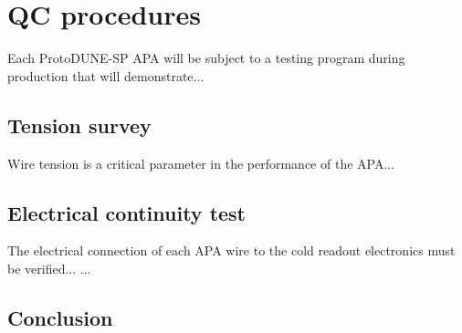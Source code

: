 \section{QC procedures}
\label{sec:apa-qc}

Each ProtoDUNE-SP APA will be subject to a testing program during production that will demonstrate...

\subsection{Tension survey}
\label{sec:apa-qc-tension}

Wire tension is a critical parameter in the performance of the APA...
\subsection{Electrical continuity test}
\label{sec:apa-continuity}

The electrical connection of each APA wire to the cold readout electronics must be verified...
...

\subsection{Conclusion}
\label{sec:apa-concl}


